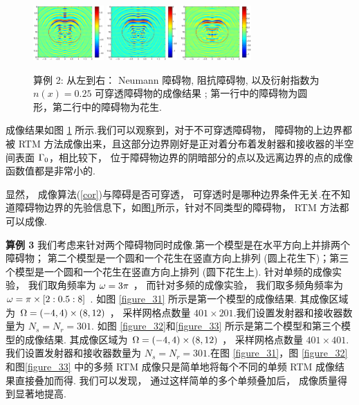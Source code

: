 {\begin{figure}[htbp]
	\includegraphics[width=0.24\textwidth]{./Img/graphic/peanut_3pi_neumann.eps}
	\includegraphics[width=0.24\textwidth]{./Img/graphic/peanut_3pi_impedance_1.eps}
	\includegraphics[width=0.24\textwidth]{./Img/graphic/peanut_3pi_transmission.eps}
	\caption{算例 2: 从左到右： Neumann 障碍物, 阻抗障碍物, 以及衍射指数为$n(x)=0.25$ 可穿透障碍物的成像结果 ; 第一行中的障碍物为圆形，第二行中的障碍物为花生.} \label{figure_11}
\end{figure}

成像结果如图 \ref{figure_11} 所示.我们可以观察到，对于不可穿透障碍物， 障碍物的上边界都被 RTM 方法成像出来，且这部分边界刚好是正对着分布着发射器和接收器的半空间表面 $\Gamma_0$，相比较下， 位于障碍物边界的阴暗部分的点以及远离边界的点的成像函数值都是非常小的.

显然， 成像算法(\ref{cor})与障碍是否可穿透， 可穿透时是哪种边界条件无关.在不知道障碍物边界的先验信息下，如图\ref{figure_11}所示，针对不同类型的障碍物， RTM 方法都可以成像.

\bigskip
\textbf{算例 3} 我们考虑来针对两个障碍物同时成像.第一个模型是在水平方向上并排两个障碍物； 第二个模型是一个圆和一个花生在竖直方向上排列 (圆上花生下)；第三个模型是一个圆和一个花生在竖直方向上排列 (圆下花生上). 针对单频的成像实验， 我们取角频率为 $\omega=3\pi$ ， 而针对多频的成像实验， 我们取多频角频率为 $\omega=\pi\times[2:0.5:8]$ . 如图 \ref{figure_31} 所示是第一个模型的成像结果. 其成像区域为 $\Omega=(-4, 4) \times (8,12)$ ， 采样网格点数量 $401 \times 201$.我们设置发射器和接收器数量为 $N_s = N_r = 301$. 如图 \ref{figure_32}和\ref{figure_33} 所示是第二个模型和第三个模型的成像结果. 其成像区域为 $\Omega=(-4, 4)\times (8,12)$ ， 采样网格点数量 $401 \times 401$. 我们设置发射器和接收器数量为 $N_s = N_r = 301$.在图 \ref{figure_31}，图 \ref{figure_32}和图\ref{figure_33} 中的多频 RTM 成像只是简单地将每个不同的单频 RTM 成像结果直接叠加而得. 我们可以发现， 通过这样简单的多个单频叠加后， 成像质量得到显著地提高.
 
}
